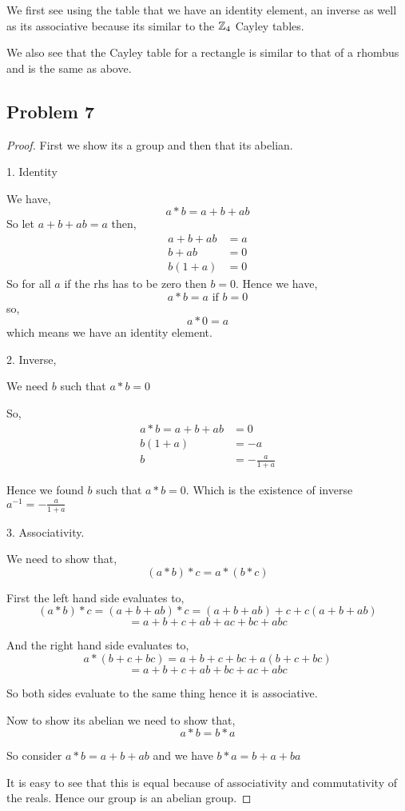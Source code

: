 \documentclass[a4paper]{report}
\begin{document}
We first see using the table that we have an identity element, an inverse as well as its associative because its similar to the $\mathbb{Z}_4$ Cayley tables.

We also see that the Cayley table for a rectangle is similar to that of a rhombus and is the same as above.


\subsection*{Problem 7}
\begin{proof}
    First we show its a group and then that its abelian.

    1. Identity

    We have, 
    $$a \ast b = a + b + ab$$
    So let $a + b + ab = a$ then, 
    \begin{align*}
        a + b + ab &= a\\
                b + ab &= 0\\
                b(1 + a) &= 0
    \end{align*}
    So for all $a$ if the rhs has to be zero then  $b = 0$. Hence we have, 
    $$ a \ast b = a \text{ if } b = 0$$  so, 
    $$ a \ast 0 = a $$ 
    which means we have an identity element.


    2. Inverse, 

    We need $b$ such that $a \ast b = 0$

    So,  
    \begin{align*}
        a \ast b = a + b + ab &= 0\\
                            b(1 + a)&= -a\\
                            b &= -\frac{a}{1 + a}
    \end{align*}

    Hence we found $b$ such that $a \ast b = 0$. Which is the existence of inverse  $a^{-1} = -\frac{a}{1 + a}$ 

    3. Associativity. 

    We need to show that, 
    $$ (a \ast b) \ast c = a \ast (b \ast c) $$ 

    First the left hand side evaluates to, 
    $$ (a \ast b) \ast c = (a + b + ab) \ast c = (a + b + ab) + c + c(a + b + ab) $$ 
    $$ = a + b + c + ab + ac + bc + abc $$ 

    And the right hand side evaluates to,
    $$ a \ast (b + c + bc) = a + b + c + bc + a(b + c + bc) $$ 
    $$ = a + b + c + ab + bc + ac + abc  $$ 

    So both sides evaluate to the same thing hence it is associative.

    Now to show its abelian we need to show that, 
    $$ a \ast b = b \ast a $$ 

    So consider $a \ast b = a + b + ab$ and we have  $ b \ast a = b + a + ba$

    It is easy to see that this is equal because of associativity and commutativity of the reals. Hence our group is an abelian group.
\end{proof}
\end{document}
